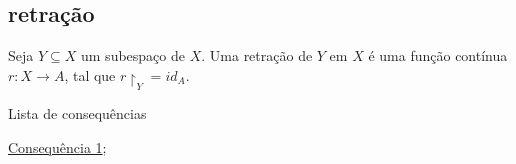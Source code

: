 \subsection{retração}
\label{retração-def}
\begin{defi}[Retração]
Seja $Y \subseteq X$ um subespaço de $X$. Uma retração de $Y$ em $X$ é uma função contínua $r:X \longrightarrow A$, tal que $r\restriction_Y = id_A$.	 
\end{defi}


\begin{titlemize}{Lista de consequências}
	\item \hyperref[teo-ponto-fixo-Brower]{Consequência 1};\\ %
	\item \hyperref[]{}
\end{titlemize}
